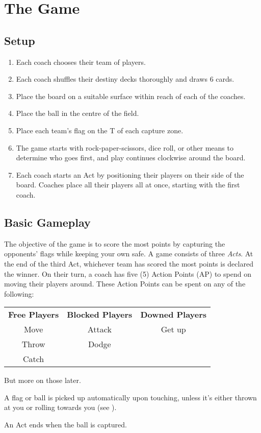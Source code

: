 \chapter{The Game}
\section{Setup}
\begin{enumerate}
    \item Each coach chooses their team of players.
    \item Each coach shuffles their destiny decks thoroughly and draws 6 cards.
    \item Place the board on a suitable surface within reach of each of the coaches.
    \item Place the ball in the centre of the field.
    \item Place each team's flag on the T of each capture zone.
    \item The game starts with rock-paper-scissors, dice roll, or other means to determine who goes first, and play continues clockwise around the board.
    \item Each coach starts an Act by positioning their players on their side of the board.
    Coaches place all their players all at once, starting with the first coach.
\end{enumerate}
\section{Basic Gameplay} \label{basic-gameplay}
The objective of the game is to score the most points by capturing the opponents' flags while keeping your own safe.
A game consists of three \textit{Acts}. 
At the end of the third Act, whichever team has scored the most points is declared the winner.
On their turn, a coach has five (5) Action Points (AP) to spend on moving their players around.
These Action Points can be spent on any of the following:

\begin{center}
\begin{tabular}{ccc}
    \textbf{Free Players} & \textbf{Blocked Players} & \textbf{Downed Players}\\
    Move  & Attack & Get up\\
    Throw & Dodge  & \\
    Catch &        & 
\end{tabular}
\end{center}
But more on those later.

A flag or ball is picked up automatically upon touching, unless it's either thrown at you or rolling towards you (see ).

An Act ends when the ball is captured.




% 


